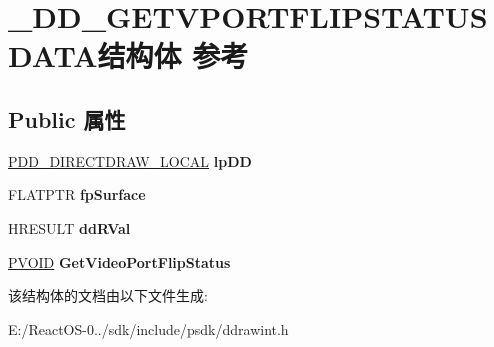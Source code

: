 \hypertarget{struct___d_d___g_e_t_v_p_o_r_t_f_l_i_p_s_t_a_t_u_s_d_a_t_a}{}\section{\+\_\+\+D\+D\+\_\+\+G\+E\+T\+V\+P\+O\+R\+T\+F\+L\+I\+P\+S\+T\+A\+T\+U\+S\+D\+A\+T\+A结构体 参考}
\label{struct___d_d___g_e_t_v_p_o_r_t_f_l_i_p_s_t_a_t_u_s_d_a_t_a}
\subsection*{Public 属性}
\begin{DoxyCompactItemize}
\item 
\mbox{\label{struct___d_d___g_e_t_v_p_o_r_t_f_l_i_p_s_t_a_t_u_s_d_a_t_a_af2630b62cd2c982ea2606f323fed58cc}} 
\hyperlink{struct___d_d___d_i_r_e_c_t_d_r_a_w___l_o_c_a_l}{P\+D\+D\+\_\+\+D\+I\+R\+E\+C\+T\+D\+R\+A\+W\+\_\+\+L\+O\+C\+AL} {\bfseries lp\+DD}
\item 
\mbox{\label{struct___d_d___g_e_t_v_p_o_r_t_f_l_i_p_s_t_a_t_u_s_d_a_t_a_ac6be340cfcacda0148cfd7c72177a87b}} 
F\+L\+A\+T\+P\+TR {\bfseries fp\+Surface}
\item 
\mbox{\label{struct___d_d___g_e_t_v_p_o_r_t_f_l_i_p_s_t_a_t_u_s_d_a_t_a_acf23a4e62561050f1db6b0e3e4ebef8f}} 
H\+R\+E\+S\+U\+LT {\bfseries dd\+R\+Val}
\item 
\mbox{\label{struct___d_d___g_e_t_v_p_o_r_t_f_l_i_p_s_t_a_t_u_s_d_a_t_a_afcca37f9eb63f34de1b9f40a68b2a1f9}} 
\hyperlink{interfacevoid}{P\+V\+O\+ID} {\bfseries Get\+Video\+Port\+Flip\+Status}
\end{DoxyCompactItemize}


该结构体的文档由以下文件生成\+:\begin{DoxyCompactItemize}
\item 
E\+:/\+React\+O\+S-\/0../sdk/include/psdk/ddrawint.\+h\end{DoxyCompactItemize}

